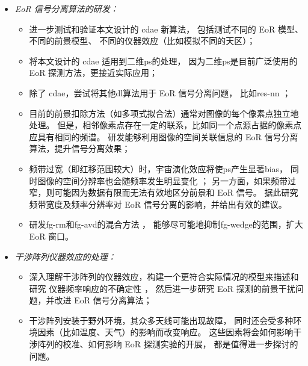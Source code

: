 \begin{summary}
\begin{itemize}
\item \emph{EoR 信号分离算法的研发：}
  \begin{itemize}
    \item 进一步测试和验证本文设计的 \ac{cdae} 新算法，
      包括测试不同的 EoR 模型、不同的前景模型、
      不同的仪器效应（比如模拟不同的天区）；
    \item 将本文设计的 \ac{cdae} 适用到二维\ac{ps}的处理，
      因为二维\ac{ps}是目前广泛使用的 EoR 探测方法，更接近实际应用；
    \item 除了 \ac{cdae}，尝试将其他\ac{dl}算法用于 EoR 信号分离问题，
      比如\ac{res-nn} \cite{he2016}；
    \item 目前的前景扣除方法（如多项式拟合法）通常对图像的每个像素点独立地处理。
      但是，相邻像素点存在一定的联系，比如同一个点源占据的像素点应具有相同的频谱。
      研发能够利用图像的空间关联信息的 EoR 信号分离算法，提升信号分离效果；
    \item 频带过宽（即红移范围较大）时，宇宙演化效应将使\ac{ps}产生显著\ac{bias}，
      同时图像的空间分辨率也会随频率发生明显变化 \cite{bowman2009}；
      另一方面，如果频带过窄，则可能因为数据有限而无法有效地区分前景和 EoR 信号。
      据此研究频带宽度及频率分辨率对 EoR 信号分离的影响，并给出有效的建议。
    \item 研发\ac{fg-rm}和\ac{fg-avd}的混合方法 \cite{kerrigan2018}，
      能够尽可能地抑制\ac{fg-wedge}的范围，扩大 EoR 窗口。
  \end{itemize}

\item \emph{干涉阵列仪器效应的处理：}
  \begin{itemize}
    \item 深入理解干涉阵列的仪器效应，构建一个更符合实际情况的模型来描述和研究
      仪器频率响应的不确定性 \cite{chapman2016}，
      然后进一步研究 EoR 探测的前景干扰问题，并改进 EoR 信号分离算法；
    \item 干涉阵列安装于野外环境，其众多天线可能出现故障，
      同时还会受多种环境因素（比如温度、天气）的影响而改变响应。
      这些因素将会如何影响干涉阵列的校准、如何影响 EoR 探测实验的开展，
      都是值得进一步探讨的问题。
  \end{itemize}
\end{itemize}

\end{summary}
